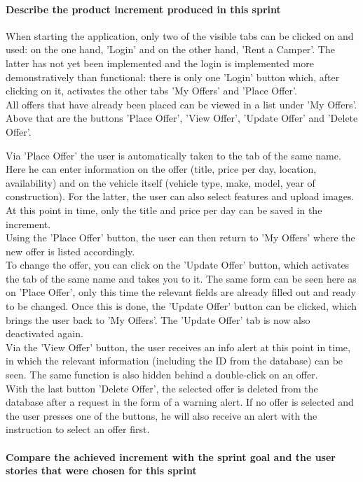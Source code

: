 \paragraph{Describe the product increment produced in this sprint}

When starting the application, only two of the visible tabs can be clicked on and used: on the one hand, 'Login' and on the other hand, 'Rent a Camper'. The latter has not yet been implemented and the login is implemented more demonstratively than functional: there is only one 'Login' button which, after clicking on it, activates the other tabs 'My Offers' and 'Place Offer'. \\
All offers that have already been placed can be viewed in a list under 'My Offers'. Above that are the buttons 'Place Offer', 'View Offer', 'Update Offer' and 'Delete Offer'. 

Via 'Place Offer' the user is automatically taken to the tab of the same name. Here he can enter information on the offer (title, price per day, location, availability) and on the vehicle itself (vehicle type, make, model, year of construction). For the latter, the user can also select features and upload images. At this point in time, only the title and price per day can be saved in the increment. \\
Using the 'Place Offer' button, the user can then return to 'My Offers' where the new offer is listed accordingly. \\
To change the offer, you can click on the 'Update Offer' button, which activates the tab of the same name and takes you to it. The same form can be seen here as on 'Place Offer', only this time the relevant fields are already filled out and ready to be changed. Once this is done, the 'Update Offer' button can be clicked, which brings the user back to 'My Offers'. The 'Update Offer' tab is now also deactivated again. \\
Via the 'View Offer' button, the user receives an info alert at this point in time, in which the relevant information (including the ID from the database) can be seen. The same function is also hidden behind a double-click on an offer. \\
With the last button 'Delete Offer', the selected offer is deleted from the database after a request in the form of a warning alert. If no offer is selected and the user presses one of the buttons, he will also receive an alert with the instruction to select an offer first.

\paragraph{Compare the achieved increment with the sprint goal and the user stories that were chosen for this sprint}

